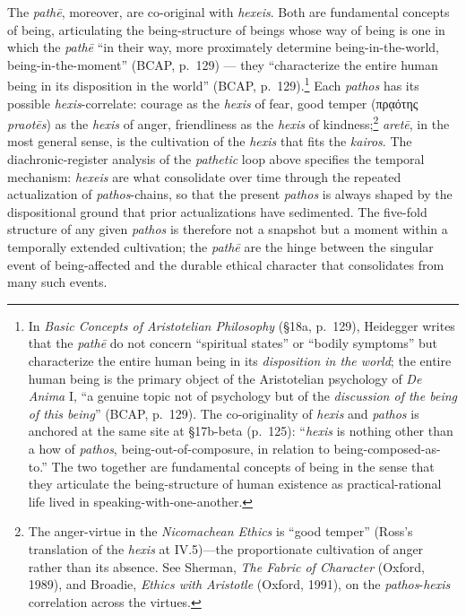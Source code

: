 \documentclass{article}
\newcommand{\gk}[1]{{\greekfont #1}}
\begin{document}
The \textit{pathē}, moreover, are co-original with \textit{hexeis}. Both are fundamental concepts of being, articulating the being-structure of beings whose way of being is one in which the \textit{pathē} ``in their way, more proximately determine being-in-the-world, being-in-the-moment'' (BCAP, p.~129) --- they ``characterize the entire human being in its disposition in the world'' (BCAP, p.~129).\footnote{In \textit{Basic Concepts of Aristotelian Philosophy} (\S 18a, p.~129), Heidegger writes that the \textit{pathē} do not concern ``spiritual states'' or ``bodily symptoms'' but characterize the entire human being in its \textit{disposition in the world}; the entire human being is the primary object of the Aristotelian psychology of \textit{De Anima} I, ``a genuine topic not of psychology but of the \textit{discussion of the being of this being}'' (BCAP, p.~129). The co-originality of \textit{hexis} and \textit{pathos} is anchored at the same site at \S 17b-beta (p.~125): ``\textit{hexis} is nothing other than a how of \textit{pathos}, being-out-of-composure, in relation to being-composed-as-to.'' The two together are fundamental concepts of being in the sense that they articulate the being-structure of human existence as practical-rational life lived in speaking-with-one-another.} Each \textit{pathos} has its possible \textit{hexis}-correlate: courage as the \textit{hexis} of fear, good temper (\gk{πρᾳότης} \textit{praotēs}) as the \textit{hexis} of anger, friendliness as the \textit{hexis} of kindness;\footnote{The anger-virtue in the \textit{Nicomachean Ethics} is ``good temper'' (Ross's translation of the \textit{hexis} at IV.5)---the proportionate cultivation of anger rather than its absence. See Sherman, \textit{The Fabric of Character} (Oxford, 1989), and Broadie, \textit{Ethics with Aristotle} (Oxford, 1991), on the \textit{pathos}-\textit{hexis} correlation across the virtues.} \textit{aretē}, in the most general sense, is the cultivation of the \textit{hexis} that fits the \textit{kairos}. The diachronic-register analysis of the \textit{pathetic} loop above specifies the temporal mechanism: \textit{hexeis} are what consolidate over time through the repeated actualization of \textit{pathos}-chains, so that the present \textit{pathos} is always shaped by the dispositional ground that prior actualizations have sedimented. The five-fold structure of any given \textit{pathos} is therefore not a snapshot but a moment within a temporally extended cultivation; the \textit{pathē} are the hinge between the singular event of being-affected and the durable ethical character that consolidates from many such events.
\end{document}
